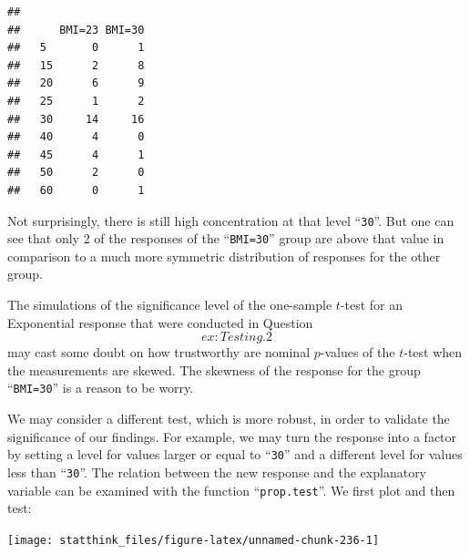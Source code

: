 \documentclass[]{krantz}
\makeatletter
\newenvironment{Shaded}{\begin{snugshade}}{\end{snugshade}}
\newcommand{\KeywordTok}[1]{\textcolor[rgb]{0.13,0.29,0.53}{\textbf{#1}}}
\newcommand{\DataTypeTok}[1]{\textcolor[rgb]{0.13,0.29,0.53}{#1}}
\newcommand{\DecValTok}[1]{\textcolor[rgb]{0.00,0.00,0.81}{#1}}
\newcommand{\OperatorTok}[1]{\textcolor[rgb]{0.81,0.36,0.00}{\textbf{#1}}}
\newcommand{\NormalTok}[1]{#1}
\newenvironment{kframe}{%
\medskip{}
\setlength{\fboxsep}{.8em}
 \def\at@end@of@kframe{}%
 \ifinner\ifhmode%
  \def\at@end@of@kframe{\end{minipage}}%
  \begin{minipage}{\columnwidth}%
 \fi\fi%
 \def\FrameCommand##1{\hskip\@totalleftmargin \hskip-\fboxsep
 \colorbox{shadecolor}{##1}\hskip-\fboxsep
     \hskip-\linewidth \hskip-\@totalleftmargin \hskip\columnwidth}%
 \MakeFramed {\advance\hsize-\width
   \@totalleftmargin\z@ \linewidth\hsize
   \@setminipage}}%
 {\par\unskip\endMakeFramed%
 \at@end@of@kframe}
\renewenvironment{Shaded}{\begin{kframe}}{\end{kframe}}
\theoremstyle{definition}
\theoremstyle{definition}
\theoremstyle{definition}
\theoremstyle{remark}
\makeatother
\begin{document}
\begin{verbatim}
##     
##      BMI=23 BMI=30
##   5       0      1
##   15      2      8
##   20      6      9
##   25      1      2
##   30     14     16
##   40      4      0
##   45      4      1
##   50      2      0
##   60      0      1
\end{verbatim}

Not surprisingly, there is still high concentration at that level
``\texttt{30}''. But one can see that only 2 of the responses of the
``\texttt{BMI=30}'' group are above that value in comparison to a much
more symmetric distribution of responses for the other group.

The simulations of the significance level of the one-sample \(t\)-test
for an Exponential response that were conducted in
Question~\[ex:Testing.2\] may cast some doubt on how trustworthy are
nominal \(p\)-values of the \(t\)-test when the measurements are skewed.
The skewness of the response for the group ``\texttt{BMI=30}'' is a
reason to be worry.

We may consider a different test, which is more robust, in order to
validate the significance of our findings. For example, we may turn the
response into a factor by setting a level for values larger or equal to
``\texttt{30}'' and a different level for values less than
``\texttt{30}''. The relation between the new response and the
explanatory variable can be examined with the function
``\texttt{prop.test}''. We first plot and then test:

\begin{Shaded}
\end{Shaded}

\begin{center}\texttt{[image: statthink\_files/figure-latex/unnamed-chunk-236-1]} \end{center}

\begin{Shaded}
\end{Shaded}
\end{document}
